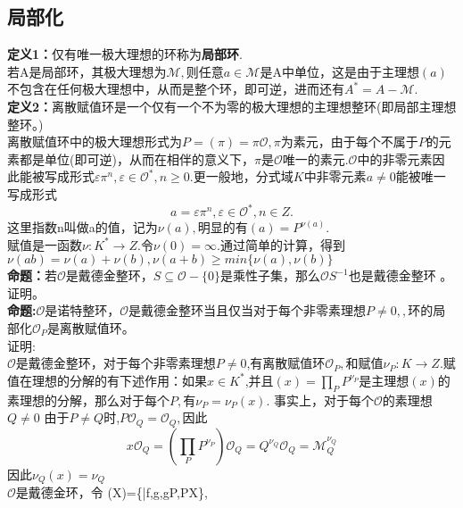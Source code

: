 \documentclass[UTF8]{article}
\begin{document}
    \subsection{局部化}
    \textbf{定义1：}仅有唯一极大理想的环称为\textbf{局部环}.\\
    若A是局部环，其极大理想为$\mathcal{M},$则任意$a\in \mathcal{M}$是A中单位，这是由于主理想$(a)$不包含在任何极大理想中，从而是整个环，即可逆，进而还有$A^{*}=A-\mathcal{M}.$\\
    \textbf{定义2：}离散赋值环是一个仅有一个不为零的极大理想的主理想整环(即局部主理想整环。)\\
    离散赋值环中的极大理想形式为$P=(\pi)=\pi \mathcal{O},$$\pi$为素元，由于每个不属于$P$的元素都是单位(即可逆)，从而在相伴的意义下，$\pi$是$\mathcal{O}$唯一的素元.$\mathcal{O}$中的非零元素因此能被写成形式$\varepsilon\pi^{n},\varepsilon \in \mathcal{O}^{*},n\geq 0.$更一般地，分式域$K$中非零元素$a\neq 0$能被唯一写成形式$$
    a=\varepsilon\pi^{n},\varepsilon\in \mathcal{O}^{*},n\in Z. 
    $$
    这里指数n叫做a的值，记为$\nu(a),$明显的有$(a)=P^{\nu(a)}.$\\
    赋值是一函数$\nu:K^{*}\rightarrow Z.$令$\nu(0)=\infty .$通过简单的计算，得到$\nu(ab)=\nu(a)+\nu(b),\nu(a+b)\geq min\{\nu(a),\nu(b)\}$\\
    \textbf{命题：}若$\mathcal{O}$是戴德金整环，$S\subseteq \mathcal{O}-\{0\}$是乘性子集，那么$\mathcal{O}S^{-1}$也是戴德金整环 。\\
    证明。\\
    \textbf{命题:}$\mathcal{O}$是诺特整环，$\mathcal{O}$是戴德金整环当且仅当对于每个非零素理想$P\neq 0,,$环的局部化$\mathcal{O}_{P}$是离散赋值环。\\
    证明:\\
    $\mathcal{O}$是戴德金整环，对于每个非零素理想$P\neq 0$,有离散赋值环$\mathcal{O}_{P},$和赋值$\nu_{P}:K\rightarrow Z.$赋值在理想的分解的有下述作用：如果$x\in K^{*}$,并且$(x)=\prod_{P}P^{\nu_{P}}$是主理想$(x)$的素理想的分解，那么对于每个$P,$有$\nu_{P}=\nu_{P}(x).$
    事实上，对于每个$\mathcal{O}$的素理想$Q\neq 0$
    由于$P\neq Q$时,$P\mathcal{O}_{Q}=\mathcal{O}_{Q},$因此$$
    x\mathcal{O}_{Q}=(\prod_{P}P^{\nu_{P}})\mathcal{O}_{Q}=Q^{\nu_{Q}}\mathcal{O}_{Q}=\mathcal{M}_{Q}^{\nu_{Q}}
    $$
    因此$\nu_{Q}(x)=\nu_{Q}$\\
    $\mathcal{O}$是戴德金环，令$$
    (X)=\{|f,g\in {},g\notin P,P\subseteq X\},
\end{document}
